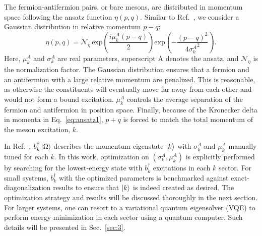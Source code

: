 \documentclass[a4paper,onecolumn,11pt,accepted=2024-10-11]{quantumarticle}
\begin{document}
The fermion-antifermion pairs, or bare mesons, are distributed in momentum space following the ansatz function $\eta(p,q)$. Similar to  Ref.~\cite{Rigobello:2021fxw}, we consider a Gaussian distribution in relative momentum $p-q$:
%
\begin{equation}
\eta(p,q) = \mathcal{N}_\eta \, \text{exp}\left(\frac{i\mu_k^A(p-q)}{2}\right) \text{exp}\left(-\frac{(p-q)^2}{4{\sigma_k^A}^2}\right).
\label{eq:ansatz3}
\end{equation}
%
Here, $\mu_k^A$ and $\sigma_k^A$ are real parameters, superscript A denotes the ansatz, and $\mathcal{N}_\eta$ is the normalization factor. The Gaussian distribution ensures that a fermion and an antifermion with a large relative momentum are penalized. This is reasonable, as otherwise the constituents will eventually move far away from each other and would not form a bound excitation. $\mu_k^A$ controls the average separation of the fermion and antifermion in position space. Finally, because of the Kronecker delta in momenta in Eq.~\eqref{eq:ansatz1}, $p+q$ is forced to match the total momentum of the meson excitation, $k$.

In Ref.~\cite{Rigobello:2021fxw}, $b_k^\dagger\ket{\Omega}$ describes the momentum eigenstate $\ket{k}$ with $\sigma_k^A$ and $\mu_k^A$ manually tuned for each $k$. In this work, optimization on $\left(\sigma_k^A,\mu_k^A\right)$ is explicitly performed by searching for the lowest-energy state with $b_k^\dagger$ excitations in each $k$ sector. For small systems, $b_k^\dagger$ with the optimized parameters is benchmarked against exact-diagonalization results to ensure that $\ket{k}$ is indeed created as desired. The optimization strategy and results will be discussed thoroughly in the next section. For larger systems, one can resort to a variational quantum eigensolver (VQE) to perform energy minimization in each sector using a quantum computer. Such details will be presented in Sec.~\ref{sec:3}. 
\end{document}
